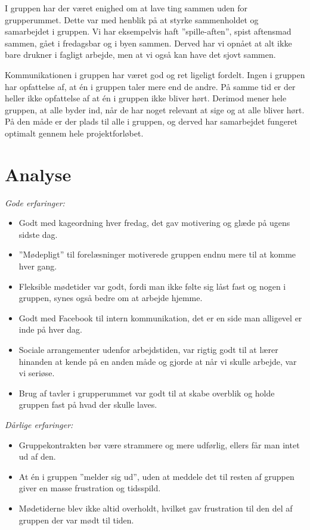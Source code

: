 I gruppen har der været enighed om at lave ting sammen uden for grupperummet. Dette var med henblik på at styrke sammenholdet og samarbejdet i gruppen. Vi har eksempelvis haft ”spille-aften”, spist aftensmad sammen, gået i fredagsbar og i byen sammen. Derved har vi opnået at alt ikke bare drukner i fagligt arbejde, men at vi også kan have det sjovt sammen.

Kommunikationen i gruppen har været god og ret ligeligt fordelt. Ingen i gruppen har opfattelse af, at én i gruppen taler mere end de andre. På samme tid er der heller ikke opfattelse af at én i gruppen ikke bliver hørt. Derimod mener hele gruppen, at alle byder ind, når de har noget relevant at sige og at alle bliver hørt. På den måde er der plads til alle i gruppen, og derved har samarbejdet fungeret optimalt gennem hele projektforløbet.

\section{Analyse}

\emph{Gode erfaringer:}
\begin{itemize}
\item	Godt med kageordning hver fredag, det gav motivering og glæde på ugens sidste dag. 

\item	”Mødepligt” til forelæsninger motiverede gruppen endnu mere til at komme hver gang. 

\item	Fleksible mødetider var godt, fordi man ikke følte sig låst fast og nogen i gruppen, synes også bedre om at arbejde hjemme.  

\item	Godt med Facebook til intern kommunikation, det er en side man alligevel er inde på hver dag.

\item	Sociale arrangementer udenfor arbejdstiden, var rigtig godt til at lærer hinanden at kende på en anden måde og gjorde at når vi skulle arbejde, var vi seriøse. 

\item	 Brug af tavler i grupperummet var godt til at skabe overblik og holde gruppen fast på hvad der skulle laves. 
\end{itemize}\emph{Dårlige erfaringer:}
\begin{itemize}
\item	Gruppekontrakten bør være strammere og mere udførlig, ellers får man intet ud af den.

\item	 At én i gruppen ”melder sig ud”, uden at meddele det til resten af gruppen giver en masse frustration og tidsspild.

\item	Mødetiderne blev ikke altid overholdt, hvilket gav frustration til den del af gruppen der var mødt til tiden.
\end{itemize}

